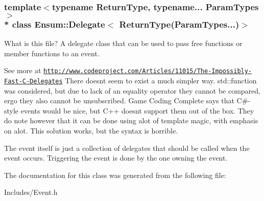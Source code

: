 \subsubsection*{template$<$typename Return\+Type, typename... Param\+Types$>$\\*
class Ensum\+::\+Delegate$<$ Return\+Type(\+Param\+Types...)$>$}

What is this file? A delegate class that can be used to pass free functions or member functions to an event. 

See more at \href{http://www.codeproject.com/Articles/11015/The-Impossibly-Fast-C-Delegates}{\tt http\+://www.\+codeproject.\+com/\+Articles/11015/\+The-\/\+Impossibly-\/\+Fast-\/\+C-\/\+Delegates} There doesn\textquotesingle{}t seem to exist a much simpler way. std\+::function was considered, but due to lack of an equality operator they cannot be compared, ergo they also cannot be unsubscribed. Game Coding Complete says that C\#-\/style events would be nice, but C++ doesn\textquotesingle{}t support them out of the box. They do note however that it can be done using alot of template magic, with emphasis on alot. This solution works, but the syntax is horrible.

The event itself is just a collection of delegates that should be called when the event occurs. Triggering the event is done by the one owning the event. 

The documentation for this class was generated from the following file\+:\begin{DoxyCompactItemize}
\item 
Includes/Event.\+h\end{DoxyCompactItemize}
